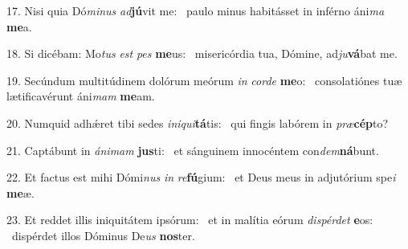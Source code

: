 17. Nisi quia Dó\textit{mi}\textit{nus} \textit{ad}\textbf{jú}vit me: \ast\  paulo minus habitásset in inférno áni\textit{ma} \textbf{me}a.\

18. Si dicébam: Mo\textit{tus} \textit{est} \textit{pes} \textbf{me}us: \ast\  misericórdia tua, Dómine, ad\textit{ju}\textbf{vá}bat me.\

19. Secúndum multitúdinem dolórum meórum \textit{in} \textit{cor}\textit{de} \textbf{me}o: \ast\  consolatiónes tuæ lætificavérunt áni\textit{mam} \textbf{me}am.\

20. Numquid adhǽret tibi sedes \textit{in}\textit{i}\textit{qui}\textbf{tá}tis: \ast\  qui fingis labórem in \textit{præ}\textbf{cép}to?\

21. Captábunt in \textit{á}\textit{ni}\textit{mam} \textbf{jus}ti: \ast\  et sánguinem innocéntem con\textit{dem}\textbf{ná}bunt.\

22. Et factus est mihi Dómi\textit{nus} \textit{in} \textit{re}\textbf{fú}gium: \ast\  et Deus meus in adjutórium spe\textit{i} \textbf{me}æ.\

23. Et reddet illis iniquitátem ipsórum: \dag\  et in malítia eórum \textit{dis}\textit{pér}\textit{det} \textbf{e}os: \ast\  dispérdet illos Dóminus De\textit{us} \textbf{nos}ter.\

